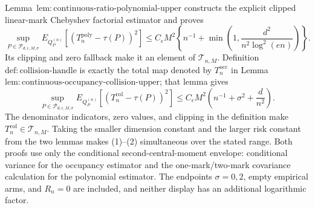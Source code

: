 Lemma~\(\mathrm{lem:continuous\text{-}ratio\text{-}polynomial\text{-}upper}\) constructs the explicit clipped linear-mark Chebyshev factorial estimator and proves
\[
 \sup_{P\in\mathcal P_{d,\epsilon,M,\sigma}}
 E_{Q_P^{(n)}}[(T_n^{\mathrm{poly}}-\tau(P))^2]
 \le C_\epsilon M^2\left\{n^{-1}+\min\left(1,\frac{d^2}{n^2\log^2(en)}\right)\right\}.
\tag{1}
\]
Its clipping and zero fallback make it an element of \(\mathcal T_{n,M}\).  Definition~\(\mathrm{def:collision\text{-}handle}\) is exactly the total map denoted by \(T_n^{\mathrm{occ}}\) in Lemma~\(\mathrm{lem:continuous\text{-}occupancy\text{-}collision\text{-}upper}\); that lemma gives
\[
 \sup_{P\in\mathcal P_{d,\epsilon,M,\sigma}}
 E_{Q_P^{(n)}}[(T_n^{\mathrm{col}}-\tau(P))^2]
 \le C_\epsilon M^2\left(n^{-1}+\sigma^2+\frac d{n^2}\right).
\tag{2}
\]
The denominator indicators, zero values, and clipping in the definition make \(T_n^{\mathrm{col}}\in\mathcal T_{n,M}\).  Taking the smaller dimension constant and the larger risk constant from the two lemmas makes (1)--(2) simultaneous over the stated range.  Both proofs use only the conditional second-central-moment envelope: conditional variance for the occupancy estimator and the one-mark/two-mark covariance calculation for the polynomial estimator.  The endpoints \(\sigma=0,2\), empty empirical arms, and \(R_n=0\) are included, and neither display has an additional logarithmic factor.